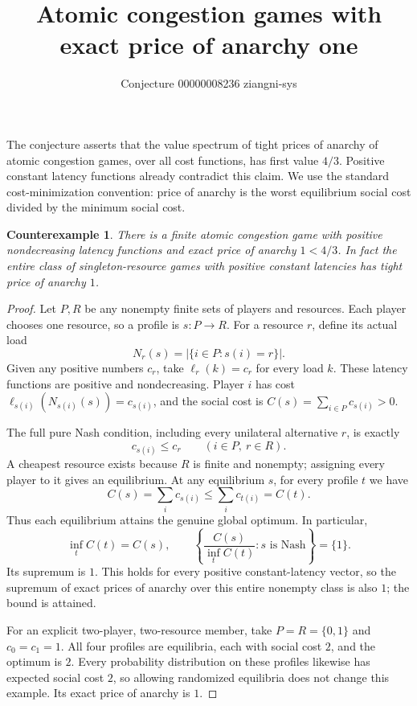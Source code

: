 \documentclass[11pt]{article}
\title{Atomic congestion games with exact price of anarchy one}
\author{Conjecture 00000008236 \quad ziangni-sys}
\date{}
\newtheorem*{proposition}{Counterexample}
\begin{document}
\maketitle
The conjecture asserts that the value spectrum of tight prices of anarchy of atomic congestion games, over all cost functions, has first value $4/3$. Positive constant latency functions already contradict this claim. We use the standard cost-minimization convention: price of anarchy is the worst equilibrium social cost divided by the minimum social cost.

\begin{proposition}
There is a finite atomic congestion game with positive nondecreasing latency functions and exact price of anarchy $1<4/3$. In fact the entire class of singleton-resource games with positive constant latencies has tight price of anarchy $1$.
\end{proposition}
\begin{proof}
Let $P,R$ be any nonempty finite sets of players and resources. Each player chooses one resource, so a profile is $s:P\to R$. For a resource $r$, define its actual load
\[
 N_r(s)=|\{i\in P:s(i)=r\}|.
\]
Given any positive numbers $c_r$, take $\ell_r(k)=c_r$ for every load $k$. These latency functions are positive and nondecreasing. Player $i$ has cost $\ell_{s(i)}(N_{s(i)}(s))=c_{s(i)}$, and the social cost is $C(s)=\sum_{i\in P}c_{s(i)}>0$.

The full pure Nash condition, including every unilateral alternative $r$, is exactly
\[
 c_{s(i)}\leq c_r\qquad(i\in P,\ r\in R).
\]
A cheapest resource exists because $R$ is finite and nonempty; assigning every player to it gives an equilibrium. At any equilibrium $s$, for every profile $t$ we have
\[
 C(s)=\sum_i c_{s(i)}\leq\sum_i c_{t(i)}=C(t).
\]
Thus each equilibrium attains the genuine global optimum. In particular,
\[
 \inf_t C(t)=C(s),\qquad
 \left\{\frac{C(s)}{\inf_t C(t)}:s\text{ is Nash}\right\}=\{1\}.
\]
Its supremum is $1$. This holds for every positive constant-latency vector, so the supremum of exact prices of anarchy over this entire nonempty class is also $1$; the bound is attained.

For an explicit two-player, two-resource member, take $P=R=\{0,1\}$ and $c_0=c_1=1$. All four profiles are equilibria, each with social cost $2$, and the optimum is $2$. Every probability distribution on these profiles likewise has expected social cost $2$, so allowing randomized equilibria does not change this example. Its exact price of anarchy is $1$.
\end{proof}
\end{document}
